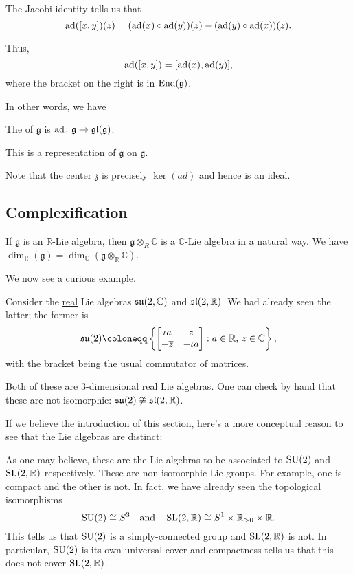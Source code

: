 \documentclass[12pt]{article}
\begin{document}
The Jacobi identity tells us that
\begin{equation*} 
	\ad([x, y])(z) = (\ad(x) \circ \ad(y))(z) - (\ad(y) \circ \ad(x))(z).
\end{equation*}

Thus,
\begin{equation*} 
	\ad([x, y]) = [\ad(x), \ad(y)],
\end{equation*}
where the bracket on the right is in $\End(\mathfrak{g})$. 

In other words, we have
\begin{defn} 
	The  of $\mathfrak{g}$ is $\ad \colon \mathfrak{g} \to \gl(\mathfrak{g})$. 
\end{defn}
This is a representation of $\mathfrak{g}$ on $\mathfrak{g}$.

Note that the center $\mathfrak{z}$ is precisely $\ker(ad)$ and hence is an ideal.

\subsection{Complexification}

If $\mathfrak{g}$ is an $\mathbb{R}$-Lie algebra, then $\mathfrak{g} \otimes_{R} \mathbb{C}$ is a $\mathbb{C}$-Lie algebra in a natural way. 
We have $\dim_{\mathbb{R}}(\mathfrak{g}) = \dim_{\mathbb{C}}(\mathfrak{g} \otimes_{\mathbb{R}} \mathbb{C})$.

We now see a curious example. 

Consider the \underline{real} Lie algebras $\su(2, \mathbb{C})$ and $\sl(2, \mathbb{R})$. 
We had already seen the latter; the former is
\begin{equation*} 
	\su(2) \coloneqq \left\{\two{\iota a}{z}{-\overline{z}}{-\iota a} : a \in \mathbb{R},\, z \in \mathbb{C}\right\},
\end{equation*}
with the bracket being the usual commutator of matrices.

Both of these are $3$-dimensional real Lie algebras. One can check by hand that these are not isomorphic: $\su(2) \not\cong \sl(2, \mathbb{R})$. \newline

\begin{blockquote}
	If we believe the introduction of this section, here's a more conceptual reason to see that the Lie algebras are distinct:

	As one may believe, these are the Lie algebras to be associated to $\SU(2)$ and $\SL(2, \mathbb{R})$ respectively. 
	These are non-isomorphic Lie groups. For example, one is compact and the other is not. 
	In fact, we have already seen the topological isomorphisms
	\begin{equation*} 
		\SU(2) \cong S^{3} \andd \SL(2, \mathbb{R}) \cong S^{1} \times \mathbb{R}_{> 0} \times \mathbb{R}.
	\end{equation*}
	This tells us that $\SU(2)$ is a simply-connected group and $\SL(2, \mathbb{R})$ is not. 
	In particular, $\SU(2)$ is its own universal cover and compactness tells us that this does not cover $\SL(2, \mathbb{R})$. 
\end{blockquote}
\end{document}
